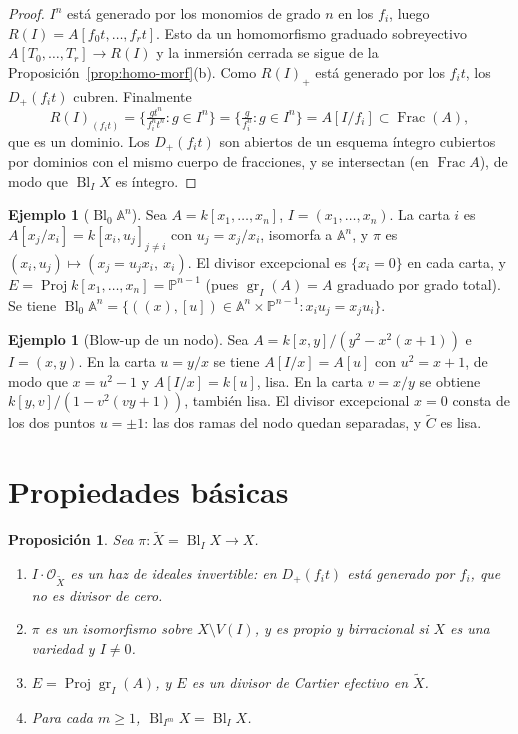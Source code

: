 \documentclass[11pt,a4paper,oneside]{book}
\newcommand{\Proj}{\operatorname{Proj}}
\newcommand{\Bl}{\operatorname{Bl}}
\newcommand{\gr}{\operatorname{gr}}
\newcommand{\Frac}{\operatorname{Frac}}
\newcommand{\A}{\mathbb{A}}
\newcommand{\PP}{\mathbb{P}}
\newcommand{\cO}{\mathcal{O}}
\theoremstyle{plain}
\newtheorem{proposicion}[teorema]{Proposición}
\theoremstyle{definition}
\newtheorem{ejemplo}[teorema]{Ejemplo}
\theoremstyle{remark}
\begin{document}
\begin{proof}
$I^n$ está generado por los monomios de grado $n$ en los $f_i$, luego $R(I)=A[f_0t,\dots,f_rt]$. Esto da un homomorfismo graduado sobreyectivo $A[T_0,\dots,T_r]\to R(I)$ y la inmersión cerrada se sigue de la Proposición~\ref{prop:homo-morf}(b). Como $R(I)_+$ está generado por los $f_it$, los $D_+(f_it)$ cubren. Finalmente
\[
R(I)_{(f_it)}=\Big\{\tfrac{gt^n}{f_i^nt^n}: g\in I^n\Big\}=\Big\{\tfrac{g}{f_i^n}:g\in I^n\Big\}=A[I/f_i]\subset\Frac(A),
\]
que es un dominio. Los $D_+(f_it)$ son abiertos de un esquema íntegro cubiertos por dominios con el mismo cuerpo de fracciones, y se intersectan (en $\Frac A$), de modo que $\Bl_IX$ es íntegro.
\end{proof}

\begin{ejemplo}[$\Bl_0\A^n$]\label{ej:blA2}
Sea $A=k[x_1,\dots,x_n]$, $I=(x_1,\dots,x_n)$. La carta $i$ es $A[x_j/x_i]=k[x_i,u_j]_{j\ne i}$ con $u_j=x_j/x_i$, isomorfa a $\A^n$, y $\pi$ es $(x_i,u_j)\mapsto(x_j=u_jx_i,\ x_i)$. El divisor excepcional es $\{x_i=0\}$ en cada carta, y $E=\Proj k[x_1,\dots,x_n]=\PP^{n-1}$ (pues $\gr_I(A)=A$ graduado por grado total). Se tiene $\Bl_0\A^n=\{((x),[u])\in\A^n\times\PP^{n-1}:x_iu_j=x_ju_i\}$.
\end{ejemplo}

\begin{ejemplo}[Blow-up de un nodo]\label{ej:nodo}
Sea $A=k[x,y]/(y^2-x^2(x+1))$ e $I=(x,y)$. En la carta $u=y/x$ se tiene $A[I/x]=A[u]$ con $u^2=x+1$, de modo que $x=u^2-1$ y $A[I/x]=k[u]$, lisa. En la carta $v=x/y$ se obtiene $k[y,v]/(1-v^2(vy+1))$, también lisa. El divisor excepcional $x=0$ consta de los dos puntos $u=\pm1$: las dos ramas del nodo quedan separadas, y $\tilde C$ es lisa.
\end{ejemplo}

\section{Propiedades básicas}

\begin{proposicion}\label{prop:basicas}
Sea $\pi:\tilde X=\Bl_IX\to X$.
\begin{enumerate}[label=(\alph*)]
\item $I\cdot\cO_{\tilde X}$ es un haz de ideales \emph{invertible}: en $D_+(f_it)$ está generado por $f_i$, que no es divisor de cero.
\item $\pi$ es un isomorfismo sobre $X\setminus V(I)$, y es propio y birracional si $X$ es una variedad y $I\ne0$.
\item $E=\Proj\gr_I(A)$, y $E$ es un divisor de Cartier efectivo en $\tilde X$.
\item Para cada $m\ge1$, $\Bl_{I^m}X=\Bl_IX$.
\end{enumerate}
\end{proposicion}
\end{document}
